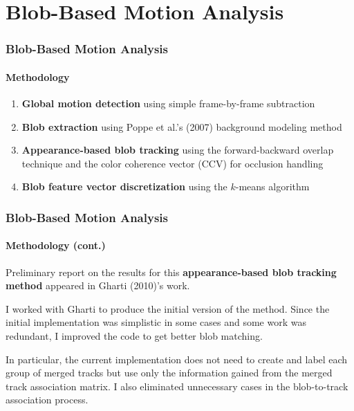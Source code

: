 
\section{Blob-Based Motion Analysis}

\begin{frame}
    \frametitle{Blob-Based Motion Analysis}
    \framesubtitle{Methodology}

    \begin{enumerate}
        \item {\bf Global motion detection} using simple frame-by-frame 
            subtraction 
        \item {\bf Blob extraction} using Poppe et al.'s (2007) background 
            modeling method 
        \item {\bf Appearance-based blob tracking} using the 
            forward-backward overlap technique and the color coherence 
            vector (CCV) for occlusion handling 
        \item {\bf Blob feature vector discretization} using the $k$-means 
            algorithm
    \end{enumerate}

\end{frame}


\begin{frame}
    \frametitle{Blob-Based Motion Analysis}
    \framesubtitle{Methodology (cont.)}

    Preliminary report on the results for this {\bf appearance-based blob 
    tracking method} appeared in Gharti (2010)'s work. 
    
    \bigskip
    
    I worked with Gharti to produce the initial version of the method. 
    Since the initial implementation was simplistic in some cases and 
    some work was redundant, I improved the code to get better blob matching. 
    
    \bigskip
    
    In particular, the current implementation does not need to create and 
    label each group of merged tracks but use only the information gained 
    from the merged track association matrix. I also eliminated unnecessary 
    cases in the blob-to-track association process.

\end{frame}

